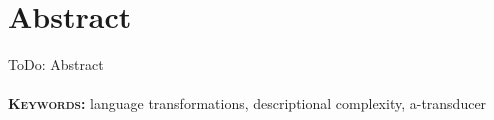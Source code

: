 \chapter*{Abstract}
ToDo: Abstract
\\
\\
\textbf{\textsc{Keywords:}} language transformations, descriptional complexity, a-transducer

